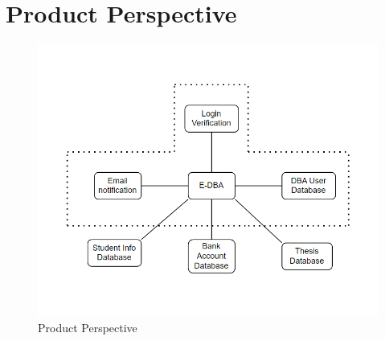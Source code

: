 \section{Product Perspective}
\begin{figure}[h]
    \centering
    \includegraphics[width=0.75\linewidth]{picture/1241740968356.jpg}
    \caption{Product Perspective}
    \label{fig:enter-label}
\end{figure}

